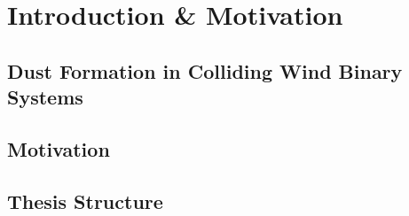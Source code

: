 \chapter{Introduction \& Motivation}

\section{Dust Formation in Colliding Wind Binary Systems}

\section{Motivation}

\section{Thesis Structure}